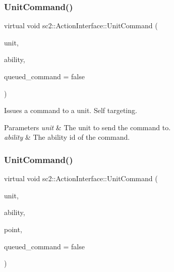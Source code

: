 \subsubsection{\texorpdfstring{Unit\+Command()}{UnitCommand()}\hspace{0.1cm}{\footnotesize\ttfamily [1/3]}}
{\footnotesize\ttfamily virtual void sc2\+::\+Action\+Interface\+::\+Unit\+Command (\begin{DoxyParamCaption}\item[{const \hyperlink{classsc2_1_1_unit}{Unit} $\ast$}]{unit,  }\item[{\hyperlink{classsc2_1_1_s_c2_type}{Ability\+ID}}]{ability,  }\item[{bool}]{queued\+\_\+command = {\ttfamily false} }\end{DoxyParamCaption})\hspace{0.3cm}{\ttfamily [pure virtual]}}

Issues a command to a unit. Self targeting. 
\begin{DoxyParams}{Parameters}
{\em unit} & The unit to send the command to. \\
\hline
{\em ability} & The ability id of the command. \\
\hline
\end{DoxyParams}
\mbox{\label{classsc2_1_1_action_interface_a7387d718d7d87c69b8476ca0d8a9f86a}} 
\subsubsection{\texorpdfstring{Unit\+Command()}{UnitCommand()}\hspace{0.1cm}{\footnotesize\ttfamily [2/3]}}
{\footnotesize\ttfamily virtual void sc2\+::\+Action\+Interface\+::\+Unit\+Command (\begin{DoxyParamCaption}\item[{const \hyperlink{classsc2_1_1_unit}{Unit} $\ast$}]{unit,  }\item[{\hyperlink{classsc2_1_1_s_c2_type}{Ability\+ID}}]{ability,  }\item[{const \hyperlink{structsc2_1_1_point2_d}{Point2D} \&}]{point,  }\item[{bool}]{queued\+\_\+command = {\ttfamily false} }\end{DoxyParamCaption})\hspace{0.3cm}{\ttfamily [pure virtual]}}

